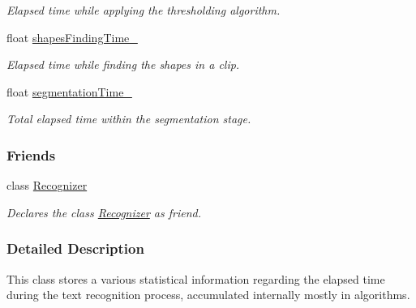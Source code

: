 \begin{CompactItemize}
\begin{CompactList}\small\item\em Elapsed time while applying the thresholding algorithm. \item\end{CompactList}\item 
\hypertarget{class_statistics_182c5f187a09c799cf37338b73ae37cd}{
float \hyperlink{class_statistics_182c5f187a09c799cf37338b73ae37cd}{shapesFindingTime\_\-}}
\label{class_statistics_182c5f187a09c799cf37338b73ae37cd}

\begin{CompactList}\small\item\em Elapsed time while finding the shapes in a clip. \item\end{CompactList}\item 
\hypertarget{class_statistics_c08594d7ee04aac7e88d62c5abe20b1f}{
float \hyperlink{class_statistics_c08594d7ee04aac7e88d62c5abe20b1f}{segmentationTime\_\-}}
\label{class_statistics_c08594d7ee04aac7e88d62c5abe20b1f}

\begin{CompactList}\small\item\em Total elapsed time within the segmentation stage. \item\end{CompactList}\end{CompactItemize}
\subsubsection*{Friends}
\begin{CompactItemize}
\item 
\hypertarget{class_statistics_11123fa51c07995419270030024a7dfe}{
class \hyperlink{class_statistics_11123fa51c07995419270030024a7dfe}{Recognizer}}
\label{class_statistics_11123fa51c07995419270030024a7dfe}

\begin{CompactList}\small\item\em Declares the class \hyperlink{class_recognizer}{Recognizer} as friend. \item\end{CompactList}\end{CompactItemize}


\subsubsection{Detailed Description}
This class stores a various statistical information regarding the elapsed time during the text recognition process, accumulated internally mostly in algorithms.

